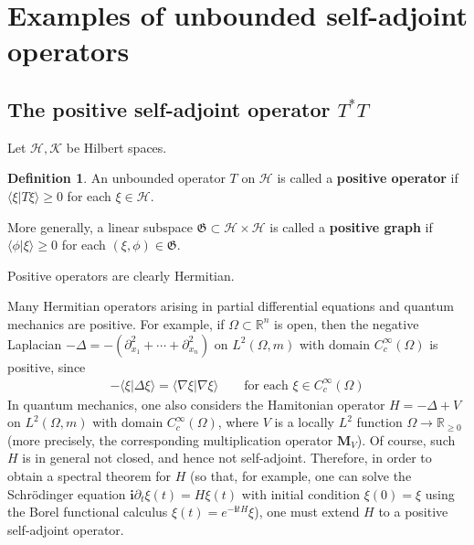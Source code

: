 \documentclass[12pt,b5paper,notitlepage]{article}
\theoremstyle{definition}
\newtheorem{df}{Definition}[subsection]
\theoremstyle{plain}
\newcommand{\fk}{\mathfrak}
\newcommand{\bk}[1]{\langle {#1}\rangle}
\newcommand{\im}{\mathbf{i}}
\newcommand{\Rbb}{\mathbb R}
\newcommand{\MH}{\mathcal H}
\newcommand{\MK}{\mathcal K}
\newcommand{\Mbf}{\mathbf M}
\newcommand{\hqed}{\hfill\qedsymbol}
\numberwithin{equation}{section}
\begin{document}
\newpage


\section{Examples of unbounded self-adjoint operators}\label{lb407}




\subsection{The positive self-adjoint operator $T^*T$}\label{lb487}



Let $\MH,\MK$ be Hilbert spaces.




\begin{df}
An unbounded operator $T$ on $\MH$ is called a \textbf{positive operator}  if $\bk{\xi|T\xi}\geq0$ for each $\xi\in\MH$. 

More generally, a linear subspace $\fk G\subset\MH\times\MH$ is called a \textbf{positive graph}  if $\bk{\phi|\xi}\geq0$ for each $(\xi,\phi)\in\fk G$.  \hqed
\end{df}

Positive operators are clearly Hermitian.



Many Hermitian operators arising in partial differential equations and quantum mechanics are positive. For example, if $\Omega\subset\Rbb^n$ is open, then the negative Laplacian $-\Delta=-(\partial_{x_1}^2+\cdots+\partial_{x_n}^2)$ on $L^2(\Omega,m)$ with domain $C_c^\infty(\Omega)$ is positive, since
\begin{align}
-\bk{\xi|\Delta\xi}=\bk{\nabla\xi|\nabla\xi}\qquad\text{for each }\xi\in C_c^\infty(\Omega)
\end{align}
In quantum mechanics, one also considers the Hamitonian operator $H=-\Delta+V$ on $L^2(\Omega,m)$ with domain $C_c^\infty(\Omega)$, where $V$ is a locally $L^2$ function $\Omega\rightarrow\Rbb_{\geq0}$ (more precisely, the corresponding multiplication operator $\Mbf_V$). Of course, such $H$ is in general not closed, and hence not self-adjoint. Therefore, in order to obtain a spectral theorem for $H$ (so that, for example, one can solve the Schr\"odinger equation $\im\partial_t\xi(t)=H\xi(t)$ with initial condition $\xi(0)=\xi$ using the Borel functional calculus $\xi(t)=e^{-\im tH}\xi$), one must extend $H$ to a positive self-adjoint operator.
\end{document}
